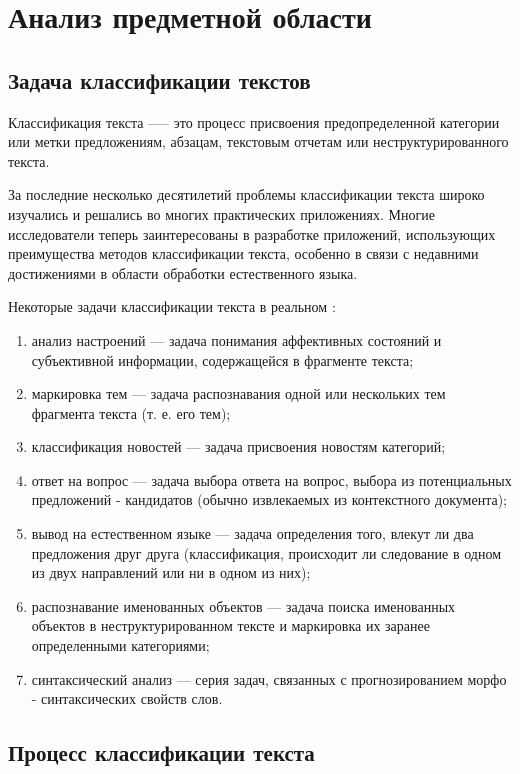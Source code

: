 
\section{Анализ предметной области}
\subsection{Задача классификации текстов}
Классификация текста —-- это процесс присвоения предопределенной категории или метки предложениям, абзацам, текстовым отчетам или неструктурированного текста.

За последние несколько десятилетий проблемы классификации текста широко изучались и решались во многих практических приложениях. Многие исследователи теперь заинтересованы в разработке приложений, использующих преимущества методов классификации текста, особенно в связи с недавними достижениями в области обработки естественного языка.

Некоторые задачи классификации текста в реальном \cite{task}:
\begin{enumerate}
    \item анализ настроений --- задача понимания аффективных состояний и субъективной информации, содержащейся в фрагменте текста;
    \item маркировка тем --- задача распознавания одной или нескольких тем фрагмента текста (т. е. его тем);
    \item классификация новостей --- задача присвоения новостям категорий;
    \item ответ на вопрос --- задача выбора ответа на вопрос, выбора из потенциальных предложений - кандидатов (обычно извлекаемых из контекстного документа);
    \item вывод на естественном языке --- задача определения того, влекут ли два предложения друг друга (классификация, происходит ли следование в одном из двух направлений или ни в одном из них);
    \item распознавание именованных объектов --- задача поиска именованных объектов в неструктурированном тексте и маркировка их заранее определенными категориями;
    \item синтаксический анализ --- серия задач, связанных с прогнозированием морфо - синтаксических свойств слов.
\end{enumerate}
\subsection{Процесс классификации текста}

